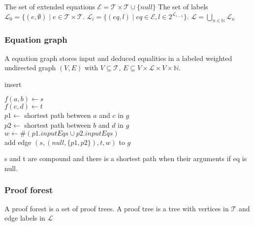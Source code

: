 The set of extended equations $\mathcal{E} = \mathcal{T} \times \mathcal{T} \cup \{null\}$
The set of labels $\mathcal{L}_0 = \{(e,\emptyset) \mid e \in \mathcal{T} \times \mathcal{T}$.
$\mathcal{L}_i = \{(eq,l) \mid eq \in \mathcal{E}, l \in 2^{\mathcal{L}_{i-1}}\}$.
$\mathcal{L} = \bigcup_{n\in \mathbb{N}} \mathcal{L}_n$

\subsubsection*{Equation graph}

A equation graph stores input and deduced equalities in a labeled weighted undirected graph $(V,E)$ with 
$V \subseteq \mathcal{T}$, $E \subseteq V \times \mathcal{L} \times V \times \mathbb{N}$.

\begin{algorithm}[h]
\caption[.]{insert}
	
	{
		$f(a,b) \leftarrow s$ \\
		$f(c,d) \leftarrow t$ \\
		$p1 \leftarrow $ shortest path between $a$ and $c$ in $g$ \\
		$p2 \leftarrow $ shortest path between $b$ and $d$ in $g$ \\
		$w \leftarrow \#(p1.inputEqs \cup p2.inputEqs) $ \\
		add edge $(s,(null,\{p1,p2\}),t,w)$ to $g$
	}
  
  \label{algo:insert_dij}
\end{algorithm}

s and t are compound and there is a shortest path when their arguments if eq is null.



\subsubsection*{Proof forest}

A proof forest is a set of proof trees.
A proof tree is a tree with vertices in $\mathcal{T}$ and edge labels in $\mathcal{L}$

